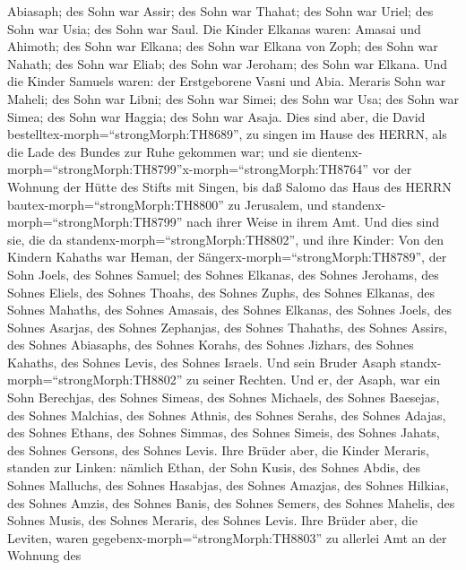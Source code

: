 Abiasaph; des Sohn war Assir;  des Sohn war Thahat; des
Sohn war Uriel; des Sohn war Usia; des Sohn war Saul.  Die
Kinder Elkanas waren: Amasai und Ahimoth;  des Sohn war
Elkana; des Sohn war Elkana von Zoph; des Sohn war Nahath; 
des Sohn war Eliab; des Sohn war Jeroham; des Sohn war Elkana.
 Und die Kinder Samuels waren: der Erstgeborene Vasni und
Abia.  Meraris Sohn war Maheli; des Sohn war Libni; des
Sohn war Simei; des Sohn war Usa;  des Sohn war Simea; des
Sohn war Haggia; des Sohn war Asaja.  Dies sind aber, die
David bestelltex-morph=``strongMorph:TH8689'', zu singen im Hause des
HERRN, als die Lade des Bundes zur Ruhe gekommen war;  und
sie dientenx-morph=``strongMorph:TH8799''x-morph=``strongMorph:TH8764''
vor der Wohnung der Hütte des Stifts mit Singen, bis daß Salomo das Haus
des HERRN bautex-morph=``strongMorph:TH8800'' zu Jerusalem, und
standenx-morph=``strongMorph:TH8799'' nach ihrer Weise in ihrem Amt.
 Und dies sind sie, die da
standenx-morph=``strongMorph:TH8802'', und ihre Kinder: Von den Kindern
Kahaths war Heman, der Sängerx-morph=``strongMorph:TH8789'', der Sohn
Joels, des Sohnes Samuel;  des Sohnes Elkanas, des Sohnes
Jerohams, des Sohnes Eliels, des Sohnes Thoahs,  des Sohnes
Zuphs, des Sohnes Elkanas, des Sohnes Mahaths, des Sohnes Amasais,
 des Sohnes Elkanas, des Sohnes Joels, des Sohnes Asarjas,
des Sohnes Zephanjas,  des Sohnes Thahaths, des Sohnes
Assirs, des Sohnes Abiasaphs, des Sohnes Korahs,  des
Sohnes Jizhars, des Sohnes Kahaths, des Sohnes Levis, des Sohnes
Israels.  Und sein Bruder Asaph
standx-morph=``strongMorph:TH8802'' zu seiner Rechten. Und er, der
Asaph, war ein Sohn Berechjas, des Sohnes Simeas,  des
Sohnes Michaels, des Sohnes Baesejas, des Sohnes Malchias, 
des Sohnes Athnis, des Sohnes Serahs, des Sohnes Adajas, 
des Sohnes Ethans, des Sohnes Simmas, des Sohnes Simeis, 
des Sohnes Jahats, des Sohnes Gersons, des Sohnes Levis. 
Ihre Brüder aber, die Kinder Meraris, standen zur Linken: nämlich Ethan,
der Sohn Kusis, des Sohnes Abdis, des Sohnes Malluchs,  des
Sohnes Hasabjas, des Sohnes Amazjas, des Sohnes Hilkias, 
des Sohnes Amzis, des Sohnes Banis, des Sohnes Semers,  des
Sohnes Mahelis, des Sohnes Musis, des Sohnes Meraris, des Sohnes Levis.
 Ihre Brüder aber, die Leviten, waren
gegebenx-morph=``strongMorph:TH8803'' zu allerlei Amt an der Wohnung des
